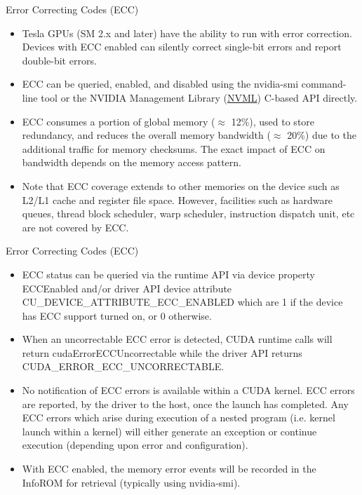 \documentclass[handout]{beamer}
\begin{document}
\begin{frame}{Error Correcting Codes (ECC)}
\begin{itemize}
	\item<1->Tesla GPUs (SM 2.x and later) have the ability to run with error correction.  Devices with ECC enabled can silently correct single-bit errors and report double-bit errors.
	\item<1->ECC can be queried, enabled, and disabled using the {\selectfont nvidia-smi} command-line tool or the NVIDIA Management Library (\href{https://developer.nvidia.com/nvidia-management-library-nvml}{\color{blue}NVML}) C-based API directly.
	\item<1->ECC consumes a portion of global memory ($\approx$ 12\%), used to store redundancy, and reduces the overall memory bandwidth ($\approx$ 20\%) due to the additional traffic for memory checksums.  The exact impact of ECC on bandwidth depends on the memory access pattern.
	\item<1->Note that ECC coverage extends to other memories on the device such as L2/L1 cache and register file space.  However, facilities such as hardware queues, thread block scheduler, warp scheduler, instruction dispatch unit, etc are not covered by ECC.
\end{itemize}
\end{frame}

\begin{frame}{Error Correcting Codes (ECC)}
\begin{itemize}
	\item<1->ECC status can be queried via the runtime API via device property {\selectfont ECCEnabled} and/or driver API device attribute {\selectfont CU\_DEVICE\_ATTRIBUTE\_ECC\_ENABLED} which are 1 if the device has ECC support turned on, or 0 otherwise.
	\item<1->When an uncorrectable ECC error is detected, CUDA runtime calls will return {\selectfont cudaErrorECCUncorrectable} while the driver API returns {\selectfont CUDA\_ERROR\_ECC\_UNCORRECTABLE}.  
	\item<1->No notification of ECC errors is available within a CUDA kernel. ECC errors are reported, by the driver to the host, once the launch has completed. Any ECC errors which arise during execution of a nested program (i.e. kernel launch within a kernel) will either generate an exception or continue execution (depending upon error and configuration).
	\item<1->With ECC enabled, the memory error events will be recorded in the InfoROM for retrieval (typically using {\selectfont nvidia-smi}).
\end{itemize}
\end{frame}
\end{document}
